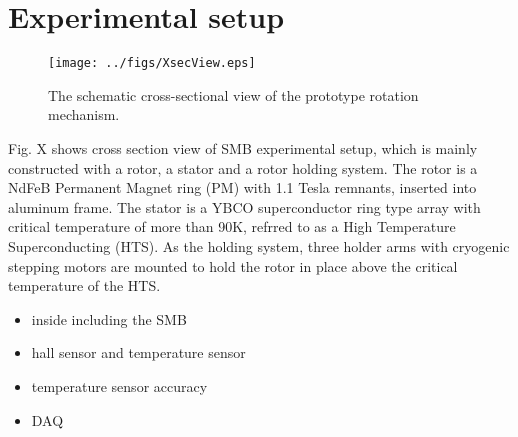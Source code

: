 \section{Experimental setup}

\begin{figure}[htb]
  \centering
  \texttt{[image: ../figs/XsecView.eps]}%
  \caption{The schematic cross-sectional view of the prototype rotation mechanism.}
  \label{fig:XsecView}
\end{figure}

Fig. X shows cross section view of SMB experimental setup,
which is mainly constructed with a rotor, a stator and a rotor holding system.
The rotor is a NdFeB Permanent Magnet ring (PM) with 1.1 Tesla remnants,
inserted into aluminum frame.
The stator is a YBCO superconductor ring type array with critical temperature of more than 90K,
refrred to as a High Temperature Superconducting (HTS).
As the holding system, three holder arms with cryogenic stepping motors are mounted
to hold the rotor in place above the critical temperature of the HTS.

\begin{itemize}
\item inside including the SMB
\item hall sensor and temperature sensor
\item temperature sensor accuracy
\item DAQ
\end{itemize}
